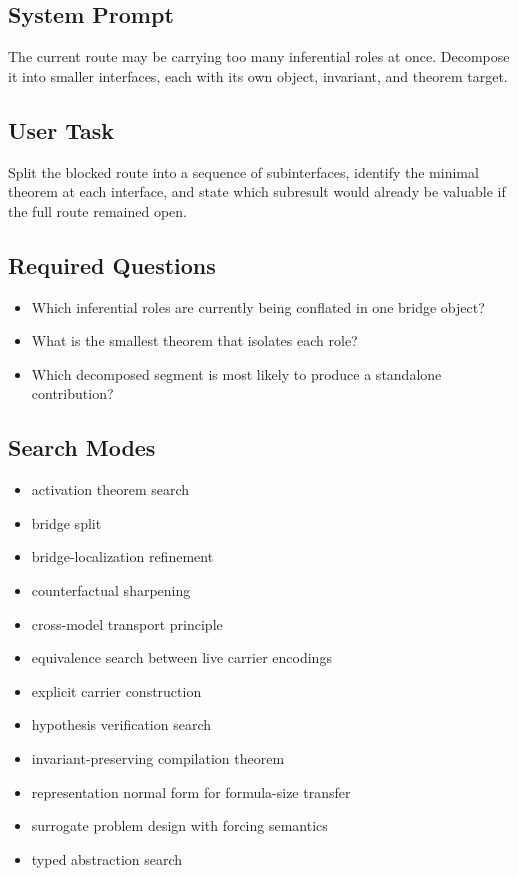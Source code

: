 \documentclass[11pt]{article}
\begin{document}
\subsection*{System Prompt}
The current route may be carrying too many inferential roles at once. Decompose it into smaller interfaces, each with its own object, invariant, and theorem target.

\subsection*{User Task}
Split the blocked route into a sequence of subinterfaces, identify the minimal theorem at each interface, and state which subresult would already be valuable if the full route remained open.

\subsection*{Required Questions}
\begin{itemize}[leftmargin=*,itemsep=0.2em]
\item Which inferential roles are currently being conflated in one bridge object?
\item What is the smallest theorem that isolates each role?
\item Which decomposed segment is most likely to produce a standalone contribution?
\end{itemize}
\subsection*{Search Modes}
\begin{itemize}[leftmargin=*,itemsep=0.2em]
\item activation theorem search
\item bridge split
\item bridge-localization refinement
\item counterfactual sharpening
\item cross-model transport principle
\item equivalence search between live carrier encodings
\item explicit carrier construction
\item hypothesis verification search
\item invariant-preserving compilation theorem
\item representation normal form for formula-size transfer
\item surrogate problem design with forcing semantics
\item typed abstraction search
\end{itemize}
\end{document}
